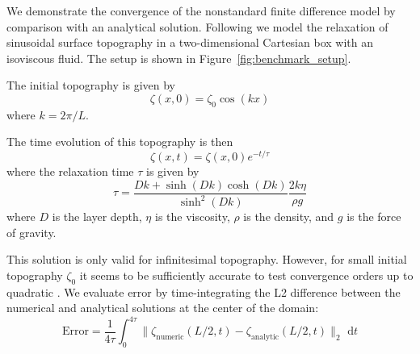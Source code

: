 \documentclass[preprint,12pt,authoryear]{elsarticle}
\begin{document}
We demonstrate the convergence of the nonstandard finite difference model by comparison 
with an analytical solution. Following \citet{kramer2012implicit} we model the relaxation
of sinusoidal surface topography in a two-dimensional Cartesian box with an isoviscous fluid.
The setup is shown in Figure~\ref{fig:benchmark_setup}.

The initial topography is given by
\begin{equation}
\zeta(x,0) = \zeta_0 \cos\left( k x \right)
\end{equation}
where $k = 2 \pi / L$.

The time evolution of this topography is then
\begin{equation}
\zeta(x, t) = \zeta(x,0) e^{-t/\tau}
\end{equation}
where the relaxation time $\tau$ is given by
\begin{equation}
\tau = \frac{D k + \sinh(D k) \cosh(D k)}{ \sinh^2 (D k) } \frac{2 k \eta}{\rho g}
\end{equation}
where $D$ is the layer depth, $\eta$ is the viscosity, $\rho$ is the density, and $g$ is the force of gravity.

This solution is only valid for infinitesimal topography. However, for small
initial topography $\zeta_0$ it seems to be sufficiently accurate to test convergence orders up 
to quadratic \citep{kramer2012implicit, furuichi2015implicit}.
We evaluate error by time-integrating the L2 difference between the numerical and analytical
solutions at the center of the domain:
\begin{equation}
\mathrm{Error} = \frac{1}{4\tau}\int_0^{4 \tau} \lVert \zeta_\mathrm{numeric}(L/2, t) - \zeta_\mathrm{analytic}(L/2, t) \rVert_2 \text{ d}t
\end{equation}
\end{document}
